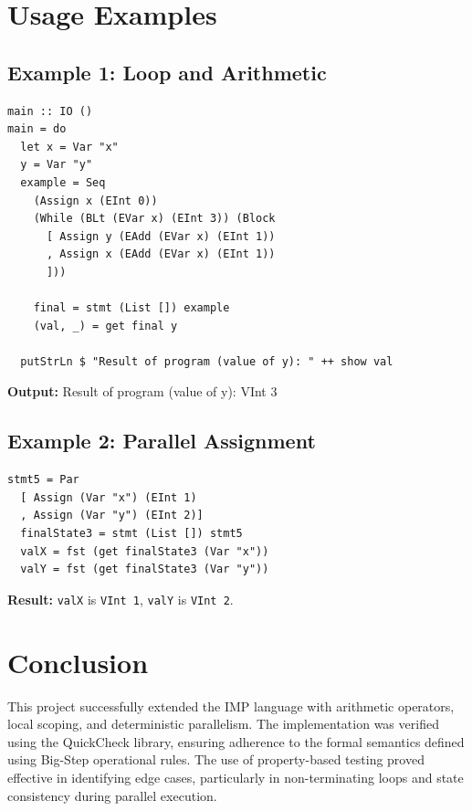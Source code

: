 \documentclass{article}
\begin{document}
	\section{Usage Examples}
	
\begin{minipage}{\linewidth}
	\subsection{Example 1: Loop and Arithmetic}
	\begin{lstlisting}
main :: IO ()
main = do
  let x = Var "x"
  y = Var "y"
  example = Seq
    (Assign x (EInt 0))
	(While (BLt (EVar x) (EInt 3)) (Block
	  [ Assign y (EAdd (EVar x) (EInt 1))
	  , Assign x (EAdd (EVar x) (EInt 1))
	  ]))
		
    final = stmt (List []) example
    (val, _) = get final y
		
  putStrLn $ "Result of program (value of y): " ++ show val
	\end{lstlisting}
	\textbf{Output:} Result of program (value of y): VInt 3
\end{minipage}
	
	\subsection{Example 2: Parallel Assignment}
	\begin{lstlisting}
stmt5 = Par 
  [ Assign (Var "x") (EInt 1)
  , Assign (Var "y") (EInt 2)]
  finalState3 = stmt (List []) stmt5
  valX = fst (get finalState3 (Var "x"))
  valY = fst (get finalState3 (Var "y"))
	\end{lstlisting}
	\textbf{Result:}
	\texttt{valX} is \texttt{VInt 1}, \texttt{valY} is \texttt{VInt 2}.
	
	\section{Conclusion}
	This project successfully extended the IMP language with arithmetic operators, local scoping, and deterministic parallelism. The implementation was verified using the QuickCheck library, ensuring adherence to the formal semantics defined using Big-Step operational rules. The use of property-based testing proved effective in identifying edge cases, particularly in non-terminating loops and state consistency during parallel execution.
	
\end{document}
